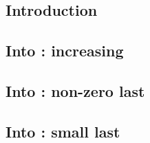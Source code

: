 \subsection{Introduction}                            \label{shakira: lookups: intro}               
\subsection{Into \wcpMod{}: increasing \shakiraId{}} \label{shakira: lookups: increasing Id}       
\subsection{Into \wcpMod{}: non-zero last \nBytes{}} \label{shakira: lookups: nonzero last nBYTES} 
\subsection{Into \wcpMod{}: small last \nBytes{}}    \label{shakira: lookups: small last nBYTES}   
